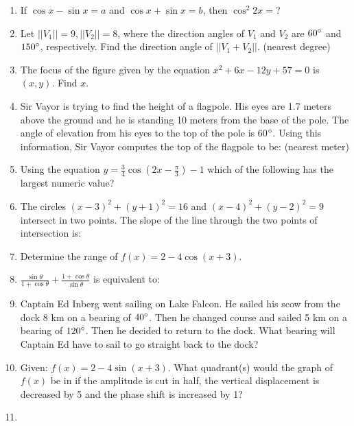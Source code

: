 \documentclass[../uilmath.tex]{subfiles}
\begin{document}
\begin{enumerate}[label=\bfseries\arabic*.]
    \item %
    If $\cos x - \sin x = a$ and $\cos x + \sin x = b$, then $\cos^2 2x=$?

    \item %
    Let $||V_1||=9, ||V_2||=8$, where the direction angles of $V_1$ and $V_2$ are $60\degree$ and $150\degree$, respectively.
    Find the direction angle of $||V_1+V_2||$. (nearest degree)

    \item %
    The focus of the figure given by the equation $x^2+6x-12y+57=0$ is $(x,y)$. Find $x$.

    \item %
    Sir Vayor is trying to find the height of a flagpole. His eyes are 1.7 meters above the ground and he is standing 10 meters from the 
    base of the pole. The angle of elevation from his eyes to the top of the pole is 60$\degree$. Using this information, Sir Vayor computes the top of the flagpole to be: (nearest meter)

    \item %
    Using the equation $y=\frac{3}{4}\cos(2x-\frac{\pi}{3})-1$ which of the following has the largest numeric value?

    \item %
    The circles $(x-3)^2+(y+1)^2=16$ and $(x-4)^2+(y-2)^2=9$ intersect in two points. The slope of the line through the two points of intersection is:

    \item %
    Determine the range of $f(x)=2-4\cos(x+3)$.

    \item %
    $\frac{\sin\theta}{1+\cos\theta}+\frac{1+\cos\theta}{\sin\theta}$ is equivalent to:

    \item %
    Captain Ed Inberg went sailing on Lake Falcon. He sailed his scow from the dock 8 km on a bearing of $40\degree$. Then he changed course and sailed 5 km on a bearing of 
    $120\degree$. Then he decided to return to the dock. What bearing will Captain Ed have to sail to go straight back to the dock?

    \item %
    Given: $f(x)=2-4\sin(x+3)$. What quadrant(s) would the graph of $f(x)$ be in if the amplitude is cut in half, the vertical displacement is decreased by 5 and the phase shift is increased by 1?

    \item %
    

\end{enumerate}
\end{document}
